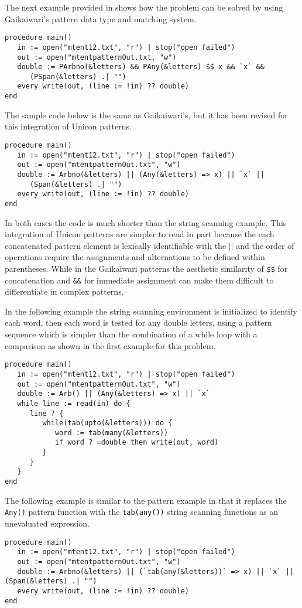 \documentclass{article}
\begin{document}
The next example provided in \cite{Gaikaiwari2005} shows how the problem can be solved by using Gaikaiwari's pattern data type and matching system.  
\begin{verbatim}
procedure main()
   in := open("mtent12.txt", "r") | stop("open failed")
   out := open("mtentpatternOut.txt, "w")
   double := PArbno(&letters) && PAny(&letters) $$ x && `x` && 
      (PSpan(&letters) .| "")
   every write(out, (line := !in) ?? double)
end
\end{verbatim}

The sample code below is the same as Gaikaiwari's, but it has been revised for this integration of Unicon patterns.
\begin{verbatim}
procedure main()
   in := open("mtent12.txt", "r") | stop("open failed")
   out := open("mtentpatternOut.txt", "w")
   double := Arbno(&letters) || (Any(&letters) => x) || `x` ||
      (Span(&letters) .| "")
   every write(out, (line := !in) ?? double)
end 
\end{verbatim}
In both cases the code is much shorter than the string scanning example.  This integration of Unicon patterns are simpler to read in part because the each concatenated pattern element is lexically identifiable with the \texttt{$||$} and the order of operations require the assignments and alternations to be defined within parentheses.  While in the Gaikaiwari patterns the aesthetic similarity of \texttt{\$\$} for concatenation and \texttt{\&\&} for immediate assignment can make them difficult to differentiate in complex patterns. 

In the following example the string scanning environment is initialized to identify each word, then each word is tested for any double letters, using a pattern sequence which is simpler than the combination of a while loop with a comparison as shown in the first example for this problem.
\begin{verbatim}
procedure main()
   in := open("mtent12.txt", "r") | stop("open failed")
   out := open("mtentpatternOut.txt", "w")
   double := Arb() || (Any(&letters) => x) || `x`
   while line := read(in) do {
      line ? {
         while(tab(upto(&letters))) do {
            word := tab(many(&letters))
            if word ? =double then write(out, word)
         }
      }
   }
end 
\end{verbatim}

The following example is similar to the pattern example in that it replaces the \texttt{Any()} pattern function with the \texttt{tab(any())} string scanning functions as an unevaluated expression.
\begin{verbatim}
procedure main()
   in := open("mtent12.txt", "r") | stop("open failed")
   out := open("mtentpatternOut.txt", "w")
   double := Arbno(&letters) || (`tab(any(&letters))` => x) || `x` || (Span(&letters) .| "")
   every write(out, (line := !in) ?? double)
end 
\end{verbatim}
\end{document}
